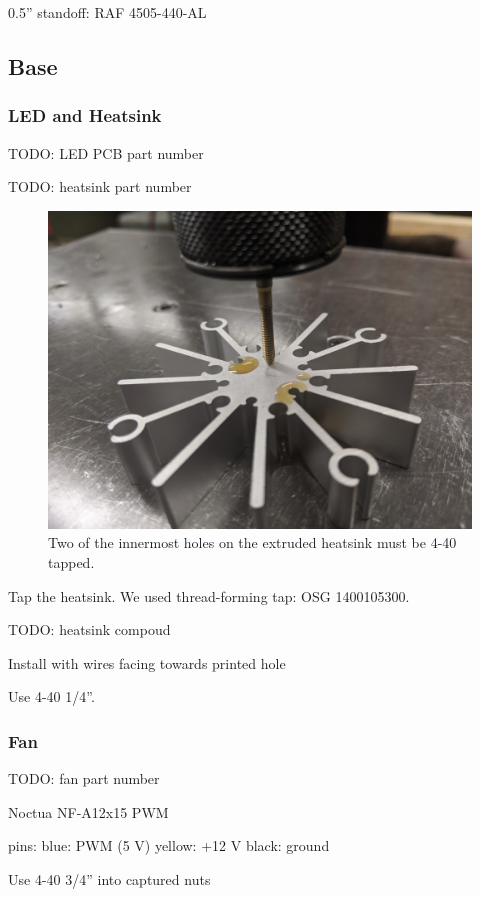 \documentclass[11pt]{article}
\begin{document}
0.5'' standoff: RAF 4505-440-AL

\subsection{Base}

\subsubsection{LED and Heatsink}

TODO: LED PCB part number

TODO: heatsink part number

\begin{figure}[H]
  \centering
  \includegraphics[width=\textwidth/2]{"./tap-heatsink.jpg"}
  \caption{Two of the innermost holes on the extruded heatsink must be 4-40 tapped.}
\end{figure}

Tap the heatsink.
We used thread-forming tap: OSG 1400105300.

TODO: heatsink compoud

Install with wires facing towards printed hole

Use 4-40 1/4''.

\subsubsection{Fan}

TODO: fan part number

Noctua NF-A12x15 PWM

pins:
blue: PWM (5 V)
yellow: +12 V
black: ground

Use 4-40 3/4'' into captured nuts
\end{document}
